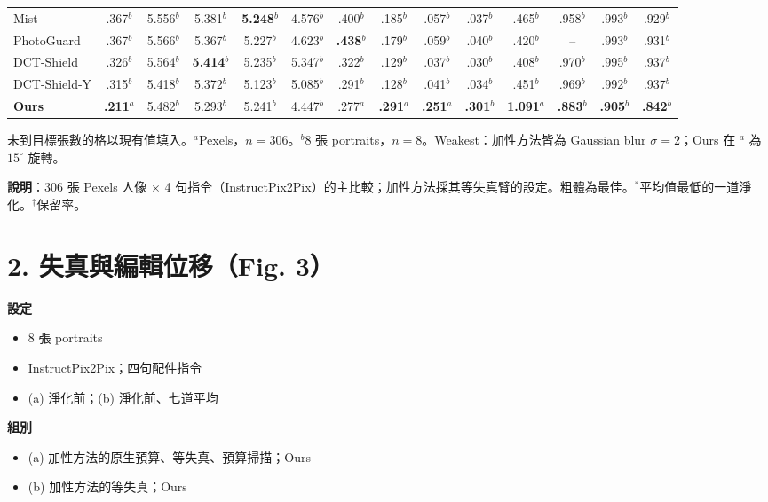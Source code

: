 \documentclass[10pt]{article}
\newcommand{\pend}[1]{#1}
\begin{document}
\begin{table}[h]
\begin{tabular}{l c cccc cccc c cc c}
    Mist & \pend{.367}$^{b}$ & \pend{5.556}$^{b}$ & \pend{5.381}$^{b}$ & \pend{\textbf{5.248}}$^{b}$ & \pend{4.576}$^{b}$ & \pend{.400}$^{b}$ & \pend{.185}$^{b}$ & \pend{.057}$^{b}$ & \pend{.037}$^{b}$ & \pend{.465}$^{b}$ & \pend{.958}$^{b}$ & \pend{.993}$^{b}$ & \pend{.929}$^{b}$ \\
    PhotoGuard & \pend{.367}$^{b}$ & \pend{5.566}$^{b}$ & \pend{5.367}$^{b}$ & \pend{5.227}$^{b}$ & \pend{4.623}$^{b}$ & \pend{\textbf{.438}}$^{b}$ & \pend{.179}$^{b}$ & \pend{.059}$^{b}$ & \pend{.040}$^{b}$ & \pend{.420}$^{b}$ & -- & \pend{.993}$^{b}$ & \pend{.931}$^{b}$ \\
    DCT-Shield & \pend{.326}$^{b}$ & \pend{5.564}$^{b}$ & \pend{\textbf{5.414}}$^{b}$ & \pend{5.235}$^{b}$ & \pend{5.347}$^{b}$ & \pend{.322}$^{b}$ & \pend{.129}$^{b}$ & \pend{.037}$^{b}$ & \pend{.030}$^{b}$ & \pend{.408}$^{b}$ & \pend{.970}$^{b}$ & \pend{.995}$^{b}$ & \pend{.937}$^{b}$ \\
    DCT-Shield-Y & \pend{.315}$^{b}$ & \pend{5.418}$^{b}$ & \pend{5.372}$^{b}$ & \pend{5.123}$^{b}$ & \pend{5.085}$^{b}$ & \pend{.291}$^{b}$ & \pend{.128}$^{b}$ & \pend{.041}$^{b}$ & \pend{.034}$^{b}$ & \pend{.451}$^{b}$ & \pend{.969}$^{b}$ & \pend{.992}$^{b}$ & \pend{.937}$^{b}$ \\
    \midrule
    \rowcolor{oursrow}
    \textbf{Ours} & \pend{\textbf{.211}}$^{a}$ & \pend{5.482}$^{b}$ & \pend{5.293}$^{b}$ & \pend{5.241}$^{b}$ & \pend{4.447}$^{b}$ & \pend{.277}$^{a}$ & \pend{\textbf{.291}}$^{a}$ & \pend{\textbf{.251}}$^{a}$ & \pend{\textbf{.301}}$^{b}$ & \pend{\textbf{1.091}}$^{a}$ & \pend{\textbf{.883}}$^{b}$ & \pend{\textbf{.905}}$^{b}$ & \pend{\textbf{.842}}$^{b}$ \\
    \bottomrule
  \end{tabular}

  \smallskip
  未到目標張數的格以現有值填入。$^{a}$Pexels，$n=306$。$^{b}$8 張 portraits，$n=8$。Weakest：加性方法皆為 Gaussian blur $\sigma=2$；Ours 在 $^{a}$ 為 $15^\circ$ 旋轉。
\end{table}

\textbf{說明}：306 張 Pexels 人像 $\times$ 4 句指令（InstructPix2Pix）的主比較；加性方法採其等失真臂的設定。粗體為最佳。$^{*}$平均值最低的一道淨化。$^{\dagger}$保留率。

\clearpage
\section*{2. 失真與編輯位移（Fig. 3）}
\textbf{設定}
\begin{itemize}
  \item 8 張 portraits
  \item InstructPix2Pix；四句配件指令
  \item (a) 淨化前；(b) 淨化前、七道平均
\end{itemize}
\textbf{組別}
\begin{itemize}
  \item (a) 加性方法的原生預算、等失真、預算掃描；Ours
  \item (b) 加性方法的等失真；Ours
\end{itemize}
\end{document}
